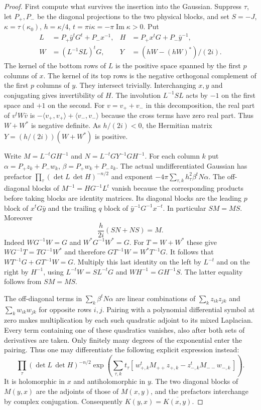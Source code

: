 \begin{proof}
First compute what survives the insertion into the Gaussian. Suppress
$\tau$, let $P_+,P_-$ be the diagonal projections to the two physical
blocks, and set $S=-J$, $\kappa=\tau(\kappa_0)$,
$h=\kappa/4$, $t=\pi i\kappa=-\pi\operatorname{Im}\kappa>0$. Put
\[
\begin{aligned}
 L&=P_+\bar y^tG^t+P_-x^{-1},&
 H&=P_+x^tG+P_-\bar y^{-1},\\
 W&=(L^{-1}SL)^tG,& Y&=(hW-(hW)^*)/(2i).
\end{aligned}
\]
The kernel of the bottom rows of $L$ is the positive space spanned
by the first $p$ columns of $x$. The kernel of its top rows is
the negative orthogonal complement of the first $p$ columns of $y$.
They intersect trivially. Interchanging $x,y$ and conjugating gives
invertibility of $H$. The involution $L^{-1}SL$ acts by $-1$ on the
first space and $+1$ on the second. For $v=v_++v_-$ in this
decomposition, the real part of $v^tW\bar v$ is
$-\langle v_+,v_+\rangle+\langle v_-,v_-\rangle$ because the
cross terms have zero real part. Thus $W+W^*$ is negative definite.
As $h/(2i)<0$, the Hermitian matrix $Y=(h/(2i))(W+W^*)$ is positive.

Write $M=L^{-t}GH^{-1}$ and $N=L^{-t}GY^{-1}GH^{-1}$.
For each column $k$ put $\alpha=P_+z_k+P_-w_k$,
$\beta=P_+w_k+P_-z_k$. The actual undifferentiated Gaussian has
prefactor $\prod_\tau(\det L\,\det H)^{-n/2}$ and exponent
$-4\pi\sum_{\tau,k}h_\tau^2\beta^t N\alpha$.
The off-diagonal blocks of $M^{-1}=HG^{-1}L^t$ vanish because
the corresponding products before taking blocks are identity
matrices. Its diagonal blocks are the leading $p$ block of
$x^tG\bar y$ and the trailing $q$ block of $\bar y^{-1}G^{-1}x^{-t}$.
In particular $SM=MS$. Moreover
\[
                     \frac{h}{2i}(SN+NS)=M .
\]
Indeed $W G^{-1}W=G$ and $W^*G^{-1}W^*=G$. For $T=W+W^*$
these give $WG^{-1}T=TG^{-1}W^*$ and therefore
$GT^{-1}W=W^*T^{-1}G$. It follows that
$WT^{-1}G+GT^{-1}W=G$. Multiply this last identity on the left
by $L^{-t}$ and on the right by $H^{-1}$,
using $L^{-t}W=SL^{-t}G$ and $WH^{-1}=GH^{-1}S$.
The latter equality follows from $SM=MS$.

The off-diagonal terms in $\sum_k\beta^t N\alpha$ are linear
combinations of $\sum_kz_{ik}z_{jk}$ and $\sum_kw_{ik}w_{jk}$
for opposite rows $i,j$. Pairing with a polynomial differential
symbol at zero makes multiplication by each such quadratic adjoint
to its mixed Laplacian. Every term containing one of these quadratics
vanishes, also after both sets of derivatives are taken. Only finitely
many degrees of the exponential enter the pairing. Thus one may
differentiate the following explicit expression instead:
\[
 \prod_\tau (\det L\,\det H)^{-n/2}
 \exp\!\left(\sum_{\tau,k}t_\tau
      [\,w_{+,k}^t M_{++}z_{+,k}-z_{-,k}^t M_{--}w_{-,k}\,]\right).
\]
It is holomorphic in $x$ and antiholomorphic in $y$.
The two diagonal blocks of $M(y,x)$ are the adjoints of those
of $M(x,y)$, and the prefactors interchange by complex conjugation.
Consequently $K(y,x)=\overline{K(x,y)}$.


\end{proof}
